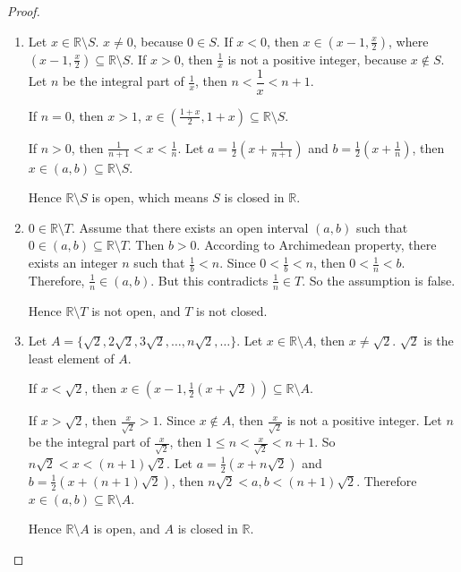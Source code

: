 \begin{proof}
	\begin{enumerate}[label={(\roman*)}]
		\item Let $x\in \mathbb{R}\setminus S$. $x\ne 0$, because $0\in S$. If $x < 0$, then $x\in (x-1, \frac{x}{2})$, where $(x-1, \frac{x}{2})\subseteq \mathbb{R}\setminus S$. If $x > 0$, then $\frac{1}{x}$ is not a positive integer, because $x\notin S$. Let $n$ be the integral part of $\frac{1}{x}$, then $n < \dfrac{1}{x} < n+1$.

		      If $n = 0$, then $x > 1$, $x\in \left(\frac{1+x}{2}, 1+x\right)\subseteq \mathbb{R}\setminus S$.

		      If $n > 0$, then $\frac{1}{n+1} < x < \frac{1}{n}$. Let $a = \frac{1}{2}\left(x + \frac{1}{n+1} \right)$ and $b = \frac{1}{2}\left(x + \frac{1}{n}\right)$, then $x\in (a, b)\subseteq \mathbb{R}\setminus S$.

		      Hence $\mathbb{R}\setminus S$ is open, which means $S$ is closed in $\mathbb{R}$.
		\item $0\in \mathbb{R}\setminus T$. Assume that there exists an open interval $(a, b)$ such that $0\in (a, b)\subseteq \mathbb{R}\setminus T$. Then $b > 0$. According to Archimedean property, there exists an integer $n$ such that $\frac{1}{b} < n$. Since $0 < \frac{1}{b} < n$, then $0 < \frac{1}{n} < b$. Therefore, $\frac{1}{n}\in (a, b)$. But this contradicts $\frac{1}{n}\in T$. So the assumption is false.

		      Hence $\mathbb{R}\setminus T$ is not open, and $T$ is not closed.
		\item Let $A = \{ \sqrt{2}, 2\sqrt{2}, 3\sqrt{2}, \ldots, n\sqrt{2}, \ldots \}$. Let $x\in \mathbb{R}\setminus A$, then $x\ne\sqrt{2}$. $\sqrt{2}$ is the least element of $A$.

		      If $x < \sqrt{2}$, then $x\in \left(x-1, \frac{1}{2}(x+\sqrt{2})\right)\subseteq \mathbb{R}\setminus A$.

		      If $x > \sqrt{2}$, then $\frac{x}{\sqrt{2}} > 1$. Since $x\notin A$, then $\frac{x}{\sqrt{2}}$ is not a positive integer. Let $n$ be the integral part of $\frac{x}{\sqrt{2}}$, then $1\leq n < \frac{x}{\sqrt{2}} < n+1$. So $n\sqrt{2} < x < (n+1)\sqrt{2}$. Let $a = \frac{1}{2}(x + n\sqrt{2})$ and $b = \frac{1}{2}(x + (n+1)\sqrt{2})$, then $n\sqrt{2} < a, b < (n+1)\sqrt{2}$. Therefore $x\in (a, b)\subseteq \mathbb{R}\setminus A$.

		      Hence $\mathbb{R}\setminus A$ is open, and $A$ is closed in $\mathbb{R}$.
	\end{enumerate}
\end{proof}
\newpage

